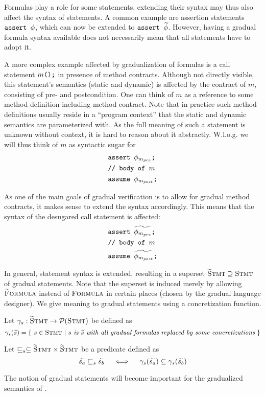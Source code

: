 Formulas play a role for some statements, extending their syntax may thus also affect the syntax of statements.
A common example are assertion statements $\textup{\texttt{assert $\phi$}}$, which can now be extended to $\textup{\texttt{assert $\widetilde{\phi}$}}$.
However, having a gradual formula syntax available does not necessarily mean that all statements have to adopt it.

A more complex example affected by gradualization of formulas is a call statement $\textup{\texttt{$m$();}}$ in presence of method contracts.
Although not directly visible, this statement's semantics (static and dynamic) is affected by the contract of $m$, consisting of pre- and postcondition.
One can think of $m$ as a reference to some method definition including method contract.
Note that in practice such method definitions usually reside in a “program context” that the static and dynamic semantics are parameterized with.
As the full meaning of such a statement is unknown without context, it is hard to reason about it abstractly.
W.l.o.g. we will thus think of $m$ as syntactic sugar for 
\begin{align*}
&\textup{\texttt{assert $\phi_{m_{pre}}$;}}\\
&\textup{\texttt{// body of $m$}}\\
&\textup{\texttt{assume $\phi_{m_{post}}$;}}
\end{align*}

As one of the main goals of gradual verification is to allow for gradual method contracts, it makes sense to extend the syntax accordingly.
This means that the syntax of the desugared call statement is affected:
\begin{align*}
&\textup{\texttt{assert $\widetilde{\phi_{m_{pre}}}$;}}\\
&\textup{\texttt{// body of $m$}}\\
&\textup{\texttt{assume $\widetilde{\phi_{m_{post}}}$;}}
\end{align*}

In general, statement syntax is extended, resulting in a superset $\textup{\textsc{\ensuremath{\widetilde{\text{S}}}tmt}} \supseteq \textup{\textsc{Stmt}}$ of gradual statements.
Note that the superset is induced merely by allowing $\textup{\textsc{\ensuremath{\widetilde{\text{F}}}ormula}}$ instead of $\textup{\textsc{Formula}}$ in certain places (chosen by the gradual language designer).
We give meaning to gradual statements using a concretization function. %
\begin{definition}
    Let $\gamma_s : \textup{\textsc{\ensuremath{\widetilde{\text{S}}}tmt}} \rightarrow \mathcal{P}(\textup{\textsc{Stmt}})$ be defined as
    \begin{displaymath}
    \gamma_s(\widetilde{s}) = \{~ s \in \textup{\textsc{Stmt}} ~|~ \textit{$s$ is $\widetilde{s}$ with all gradual formulas replaced by some concretizations} ~\}
    \end{displaymath}
\end{definition}
\begin{definition}
    Let $\sqsubseteq_s \subseteq \textup{\textsc{\ensuremath{\widetilde{\text{S}}}tmt}} \times \textup{\textsc{\ensuremath{\widetilde{\text{S}}}tmt}}$ be a predicate defined as
    $$\widetilde{s_a} \sqsubseteq_s \widetilde{s_b}  \quad\iff\quad  \gamma_s(\widetilde{s_a}) \subseteq \gamma_s(\widetilde{s_b})$$
\end{definition}

The notion of gradual statements will become important for the gradualized semantics of \gvl.
